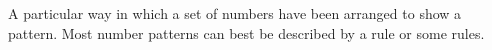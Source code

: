 A particular way in which a set of numbers have been arranged to show a 
pattern.  Most number patterns can best be described by a rule or some rules.